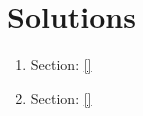 \section{\textbf{Solutions}} \label{Solutions}

\begin{enumerate}
  \item Section: \ref{}
  \item Section: \ref{}
 
 \begin{lstlisting}
 \end{lstlisting}

\end{enumerate} 
  